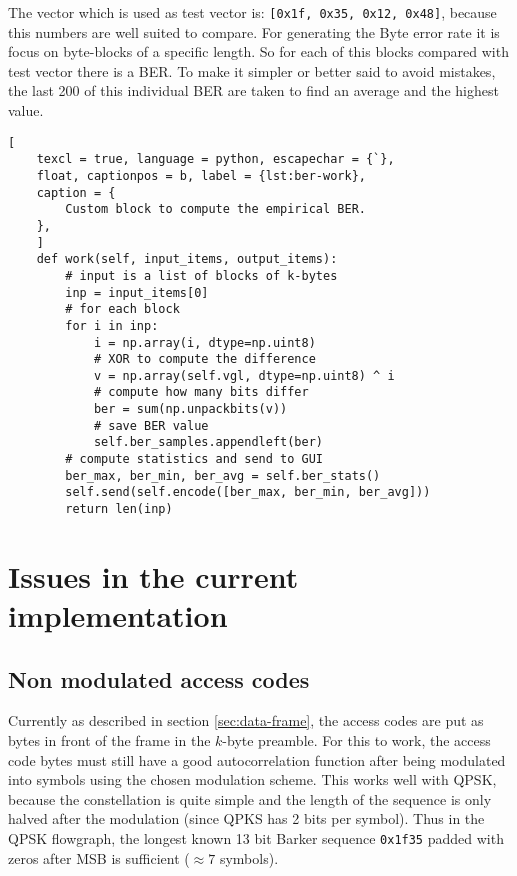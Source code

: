 The vector which is used as test vector is: \texttt{[0x1f, 0x35, 0x12, 0x48]}, because this numbers are well suited to compare.
For generating the Byte error rate it is focus on byte-blocks of a specific length. So for each of this blocks compared with test vector there is a BER. To make it simpler or better said to avoid mistakes, the last 200 of this individual BER are taken to find an average and the highest value. 



\begin{lstlisting}[
	texcl = true, language = python, escapechar = {`},
	float, captionpos = b, label = {lst:ber-work},
	caption = {
		Custom block to compute the empirical BER.
	},
	]
	def work(self, input_items, output_items):
		# input is a list of blocks of k-bytes
		inp = input_items[0]
		# for each block
		for i in inp:
			i = np.array(i, dtype=np.uint8)
			# XOR to compute the difference
			v = np.array(self.vgl, dtype=np.uint8) ^ i
			# compute how many bits differ
			ber = sum(np.unpackbits(v))
			# save BER value
			self.ber_samples.appendleft(ber)
		# compute statistics and send to GUI
		ber_max, ber_min, ber_avg = self.ber_stats()
		self.send(self.encode([ber_max, ber_min, ber_avg]))
		return len(inp)
\end{lstlisting}


\section{Issues in the current implementation}

\subsection{Non modulated access codes}

Currently as described in section \ref{sec:data-frame}, the access codes are put as bytes in front of the frame in the \(k\)-byte preamble. For this to work, the access code bytes must still have a good autocorrelation function after being modulated into symbols using the chosen modulation scheme. This works well with QPSK, because the constellation is quite simple and the length of the sequence is only halved after the modulation (since QPKS has 2 bits per symbol). Thus in the QPSK flowgraph, the longest known 13 bit Barker sequence \texttt{0x1f35} padded with zeros after MSB is sufficient (\(\approx 7\) symbols).

